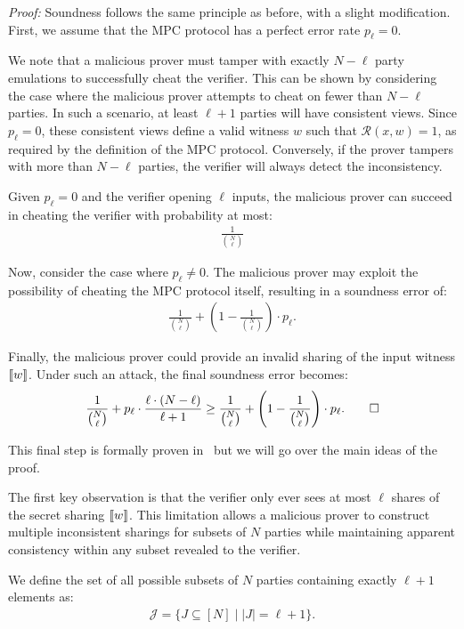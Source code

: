 \documentclass[11pt]{report}
\theoremstyle{definition}
\theoremstyle{plain}
\begin{document}
\textit{Proof:} Soundness follows the same principle as before, with a slight modification. First, we assume that the MPC protocol has a perfect error rate $p_{\ell} = 0$.

We note that a malicious prover must tamper with exactly $N - \ell$ party emulations to successfully cheat the verifier. This can be shown by considering the case where the malicious prover attempts to cheat on fewer than $N - \ell$ parties. In such a scenario, at least $\ell + 1$ parties will have consistent views. Since $p_{\ell} = 0$, these consistent views define a valid witness $w$ such that $\mathcal{R}(x, w) = 1$, as required by the definition of the MPC protocol. Conversely, if the prover tampers with more than $N - \ell$ parties, the verifier will always detect the inconsistency.


Given $p_{\ell} = 0$ and the verifier opening $\ell$ inputs, the malicious prover can succeed in cheating the verifier with probability at most:
\begin{align*}
  \frac{1}{\binom{N}{\ell}}
\end{align*}

Now, consider the case where $p_{\ell} \neq 0$. The malicious prover may exploit the possibility of cheating the MPC protocol itself, resulting in a soundness error of:
\begin{align*}
  \frac{1}{\binom{N}{\ell}} + \left(1 - \frac{1}{\binom{N}{\ell}}\right) \cdot p_{\ell}.
\end{align*}

Finally, the malicious prover could provide an invalid sharing of the input witness $ \llbracket w \rrbracket $. Under such an attack, the final soundness error becomes:
\begin{align*}
  \frac{1}{\binom{N}{\ell}} + p_{\ell} \cdot \frac{\ell \cdot (N - \ell)}{\ell + 1} \geq \frac{1}{\binom{N}{\ell}} + \left(1 - \frac{1}{\binom{N}{\ell}}\right) \cdot p_{\ell}. \qed
\end{align*}

This final step is formally proven in~\cite[p20]{feneuil2023threshold} but we will go over the main ideas of the proof.

The first key observation is that the verifier only ever sees at most $\ell$ shares of the secret sharing $\llbracket w \rrbracket$. This limitation allows a malicious prover to construct multiple inconsistent sharings for subsets of $N$ parties while maintaining apparent consistency within any subset revealed to the verifier.

We define the set of all possible subsets of $N$ parties containing exactly $\ell + 1$ elements as:
\begin{align}
  \mathcal{J} = \{J \subseteq [N] \mid |J| = \ell + 1\}.
\end{align}
\end{document}
